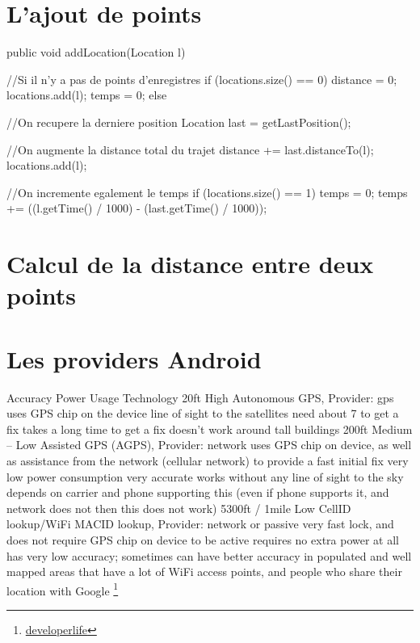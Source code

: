 \begin{appendices}
\chapter{L'ajout de points}

\label{Annexe1}
\begin{java}  
public void addLocation(Location l) {
	//Si il n'y a pas de points d'enregistres
	if (locations.size() == 0) {
		distance = 0;
		locations.add(l);
		temps = 0;
	} else {
	
	//On recupere la derniere position 
	Location last = getLastPosition();
	
	//On augmente la distance total du trajet 
	distance += last.distanceTo(l);
	locations.add(l);
 	
 	//On incremente egalement le temps 
	if (locations.size() == 1) {
		temps = 0;
	} 
	temps += ((l.getTime() / 1000) - (last.getTime() / 1000));   
	}
}
\end{java}

\chapter{Calcul de la distance entre deux points}
\label{Annexe2}

\chapter{Les providers Android}
\label{Annexe3}
Accuracy	Power Usage	Technology
20ft	High	Autonomous GPS, Provider: gps
uses GPS chip on the device
line of sight to the satellites
need about 7 to get a fix
takes a long time to get a fix
doesn’t work around tall buildings
200ft	Medium – Low	Assisted GPS (AGPS), Provider: network
uses GPS chip on device, as well as assistance from the network (cellular network) to provide a fast initial fix
very low power consumption
very accurate
works without any line of sight to the sky
depends on carrier and phone supporting this (even if phone supports it, and network does not then this does not work)
5300ft / 1mile	Low	CellID lookup/WiFi MACID lookup, Provider: network or passive
very fast lock, and does not require GPS chip on device to be active
requires no extra power at all
has very low accuracy; sometimes can have better accuracy in populated and well mapped areas that have a lot of WiFi access points, and people who share their location with Google
\footnote{\href{http://developerlife.com/tutorials/?p=1375}{developerlife}}
\end{appendices}